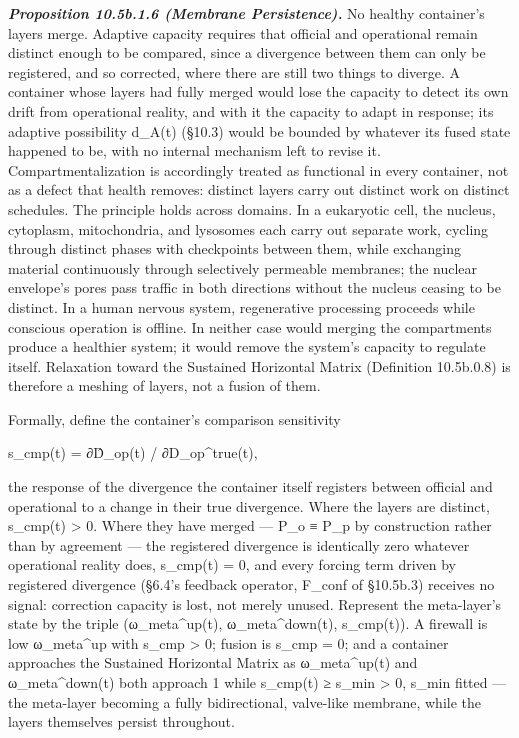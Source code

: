 \documentclass[
]{article}
\begin{document}
\emph{\textbf{Proposition 10.5b.1.6 (Membrane Persistence).}} No healthy
container's layers merge. Adaptive capacity requires that official and
operational remain distinct enough to be compared, since a divergence
between them can only be registered, and so corrected, where there are
still two things to diverge. A container whose layers had fully merged
would lose the capacity to detect its own drift from operational
reality, and with it the capacity to adapt in response; its adaptive
possibility d\_A(t) (§10.3) would be bounded by whatever its fused state
happened to be, with no internal mechanism left to revise it.
Compartmentalization is accordingly treated as functional in every
container, not as a defect that health removes: distinct layers carry
out distinct work on distinct schedules. The principle holds across
domains. In a eukaryotic cell, the nucleus, cytoplasm, mitochondria, and
lysosomes each carry out separate work, cycling through distinct phases
with checkpoints between them, while exchanging material continuously
through selectively permeable membranes; the nuclear envelope's pores
pass traffic in both directions without the nucleus ceasing to be
distinct. In a human nervous system, regenerative processing proceeds
while conscious operation is offline. In neither case would merging the
compartments produce a healthier system; it would remove the system's
capacity to regulate itself. Relaxation toward the Sustained Horizontal
Matrix (Definition 10.5b.0.8) is therefore a meshing of layers, not a
fusion of them.

Formally, define the container's comparison sensitivity

s\_cmp(t) = ∂D̂\_op(t) / ∂D\_op\^{}true(t),

the response of the divergence the container itself registers between
official and operational to a change in their true divergence. Where the
layers are distinct, s\_cmp(t) \textgreater{} 0. Where they have merged
--- P\_o ≡ P\_p by construction rather than by agreement --- the
registered divergence is identically zero whatever operational reality
does, s\_cmp(t) = 0, and every forcing term driven by registered
divergence (§6.4's feedback operator, F\_conf of §10.5b.3) receives no
signal: correction capacity is lost, not merely unused. Represent the
meta-layer's state by the triple (ω\_meta\^{}up(t), ω\_meta\^{}down(t),
s\_cmp(t)). A firewall is low ω\_meta\^{}up with s\_cmp \textgreater{} 0;
fusion is s\_cmp = 0; and a container approaches the Sustained
Horizontal Matrix as ω\_meta\^{}up(t) and ω\_meta\^{}down(t) both
approach 1 while s\_cmp(t) ≥ s\_min \textgreater{} 0, s\_min fitted --- the
meta-layer becoming a fully bidirectional, valve-like membrane, while the
layers themselves persist throughout.
\end{document}
